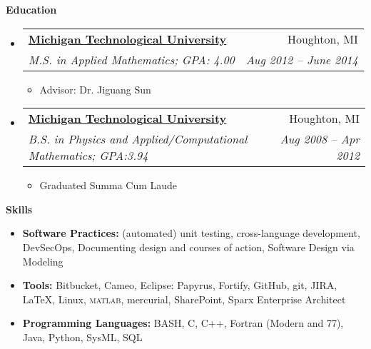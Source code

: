 \documentclass[letterpaper,11pt]{article}
\makeatletter
\newcommand{\resitem}[1]{\item #1 \vspace{-2pt}}
\newcommand{\resheading}[1]{{\large \textbf{#1}}}
\newcommand{\ressubheading}[4]{
\begin{tabular*}{6.5in}{l@{\extracolsep{\fill}}r}
		\textbf{#1} & #2 \\
		\textit{#3} & \textit{#4} \\
\end{tabular*}\vspace{-6pt}}
\makeatother
\begin{document}
\resheading{Education}
	\begin{itemize}
		\item
			\ressubheading{\href{www.mtu.edu}{Michigan Technological University}}{Houghton, MI}{M.S. in Applied Mathematics; GPA: 4.00}{Aug 2012 -- June 2014}
				{ \footnotesize
				\begin{itemize}
					\resitem{Advisor: Dr. Jiguang Sun} 
				\end{itemize}
				}
		\item
			\ressubheading{\href{www.mtu.edu}{Michigan Technological University}}{Houghton, MI}{B.S. in Physics and Applied/Computational Mathematics; GPA:3.94}{Aug 2008 -- Apr 2012}
				{ \footnotesize
				\begin{itemize}
					\resitem{Graduated Summa Cum Laude} 
				\end{itemize}
				}
\begin{comment}%
		\item
			\ressubheading{\href{http://www.isd12.org/chs/}{Centennial High School}}{Circle Pines, MN}{GPA:3.79}{Sep. 2003 - June 2008}
				{ \footnotesize
				\begin{itemize}
				\resitem{Graduated with honors}
				\end{itemize}
				}
\end{comment}
	\end{itemize} %


\resheading{Skills}
\begin{itemize}
  \resitem{\textbf{Software Practices:} (automated) unit testing, cross-language development, DevSecOps, Documenting design and courses of action, Software Design via Modeling}
  \resitem{\textbf{Tools:} Bitbucket, Cameo, Eclipse: Papyrus, Fortify, GitHub, git, JIRA, \LaTeX,  Linux, \textsc{matlab}, mercurial, SharePoint, Sparx Enterprise Architect}
  \resitem{\textbf{Programming Languages:} BASH, C, C++, Fortran (Modern and 77), Java, Python, SysML, SQL}
\end{itemize}
\end{document}
